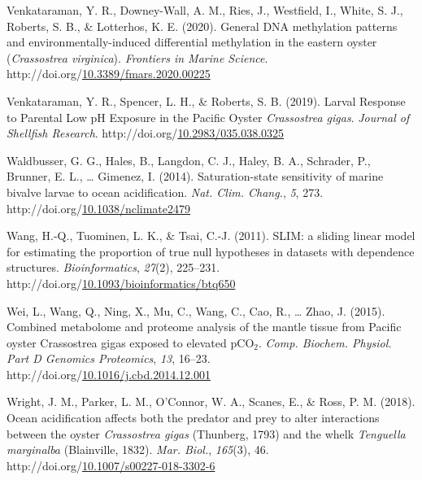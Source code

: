 \documentclass [11pt, proquest] {uwthesis}[2015/03/03]
\newlength{\cslhangindent}
\newenvironment{CSLReferences}%
{\setlength{\parindent}{0pt}%
\everypar{\setlength{\hangindent}{\cslhangindent}}\ignorespaces}%
{\par}
\begin{document}
\begin{CSLReferences}{1}{0}
\leavevmode\hypertarget{ref-Venkataraman2020}{}%
Venkataraman, Y. R., Downey-Wall, A. M., Ries, J., Westfield, I., White, S. J., Roberts, S. B., \& Lotterhos, K. E. (2020). {General DNA methylation patterns and environmentally-induced differential methylation in the eastern oyster (\emph{Crassostrea virginica})}. \emph{Frontiers in Marine Science}. http://doi.org/\href{https://doi.org/10.3389/fmars.2020.00225}{10.3389/fmars.2020.00225}

\leavevmode\hypertarget{ref-Venkataraman2019}{}%
Venkataraman, Y. R., Spencer, L. H., \& Roberts, S. B. (2019). {Larval Response to Parental Low pH Exposure in the Pacific Oyster \emph{Crassostrea gigas}}. \emph{Journal of Shellfish Research}. http://doi.org/\href{https://doi.org/10.2983/035.038.0325}{10.2983/035.038.0325}

\leavevmode\hypertarget{ref-Waldbusser2014}{}%
Waldbusser, G. G., Hales, B., Langdon, C. J., Haley, B. A., Schrader, P., Brunner, E. L., \ldots{} Gimenez, I. (2014). {Saturation-state sensitivity of marine bivalve larvae to ocean acidification}. \emph{Nat. Clim. Chang.}, \emph{5}, 273. http://doi.org/\href{https://doi.org/10.1038/nclimate2479}{10.1038/nclimate2479}

\leavevmode\hypertarget{ref-Wang2011}{}%
Wang, H.-Q., Tuominen, L. K., \& Tsai, C.-J. (2011). {SLIM: a sliding linear model for estimating the proportion of true null hypotheses in datasets with dependence structures}. \emph{Bioinformatics}, \emph{27}(2), 225--231. http://doi.org/\href{https://doi.org/10.1093/bioinformatics/btq650}{10.1093/bioinformatics/btq650}

\leavevmode\hypertarget{ref-Wei2015}{}%
Wei, L., Wang, Q., Ning, X., Mu, C., Wang, C., Cao, R., \ldots{} Zhao, J. (2015). {Combined metabolome and proteome analysis of the mantle tissue from Pacific oyster {Crassostrea gigas} exposed to elevated {pCO\(_2\)}}. \emph{Comp. Biochem. Physiol. Part D Genomics Proteomics}, \emph{13}, 16--23. http://doi.org/\href{https://doi.org/10.1016/j.cbd.2014.12.001}{10.1016/j.cbd.2014.12.001}

\leavevmode\hypertarget{ref-Wright2018}{}%
Wright, J. M., Parker, L. M., O'Connor, W. A., Scanes, E., \& Ross, P. M. (2018). {Ocean acidification affects both the predator and prey to alter interactions between the oyster \emph{Crassostrea gigas} (Thunberg, 1793) and the whelk \emph{Tenguella marginalba} (Blainville, 1832)}. \emph{Mar. Biol.}, \emph{165}(3), 46. http://doi.org/\href{https://doi.org/10.1007/s00227-018-3302-6}{10.1007/s00227-018-3302-6}


\end{CSLReferences}
\end{document}
